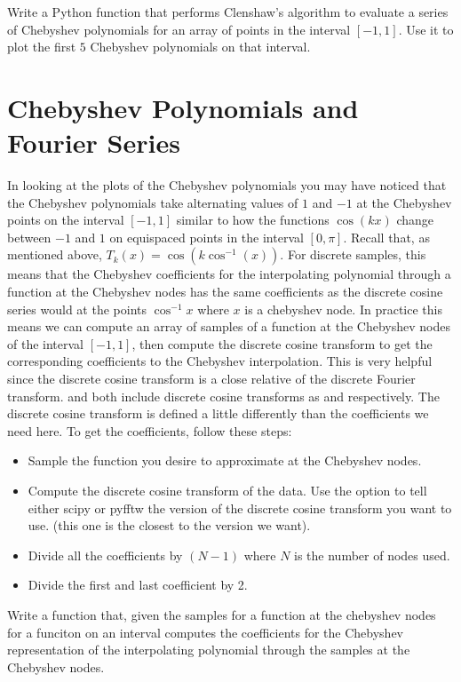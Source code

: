 \begin{problem}
Write a Python function that performs Clenshaw's algorithm to evaluate a series of Chebyshev polynomials for an array of points in the interval $[-1, 1]$.
Use it to plot the first $5$ Chebyshev polynomials on that interval.
\end{problem}

\section*{Chebyshev Polynomials and Fourier Series}
In looking at the plots of the Chebyshev polynomials you may have noticed that the Chebyshev polynomials take alternating values of $1$ and $-1$ at the Chebyshev points on the interval $[-1,1]$ similar to how the functions $\cos\left(k x \right)$ change between $-1$ and $1$ on equispaced points in the interval $[ 0 , \pi ]$.
Recall that, as mentioned above, $T_k \left( x \right) = \cos \left( k \cos^{-1} \left( x \right) \right)$.
For discrete samples, this means that the Chebyshev coefficients for the interpolating polynomial through a function at the Chebyshev nodes has the same coefficients as the discrete cosine series would at the points $\cos^{-1} x$ where $x$ is a chebyshev node.
In practice this means we can compute an array of samples of a function at the Chebyshev nodes of the interval $[-1, 1]$, then compute the discrete cosine transform to get the corresponding coefficients to the Chebyshev interpolation.
This is very helpful since the discrete cosine transform is a close relative of the discrete Fourier transform.
 and  both include discrete cosine transforms as  and  respectively.
The discrete cosine transform is defined a little differently than the coefficients we need here.
To get the coefficients, follow these steps:

\begin{itemize}

\item Sample the function you desire to approximate at the Chebyshev nodes.

\item Compute the discrete cosine transform of the data.
Use the option  to tell either scipy or pyfftw the version of the discrete cosine transform you want to use. (this one is the closest to the version we want).

\item Divide all the coefficients by $\left( N - 1 \right)$ where $N$ is the number of nodes used.

\item Divide the first and last coefficient by 2.

\end{itemize}

\begin{problem}
Write a function that, given the samples for a function at the chebyshev nodes for a funciton on an interval computes the coefficients for the Chebyshev representation of the interpolating polynomial through the samples at the Chebyshev nodes.
\end{problem}
